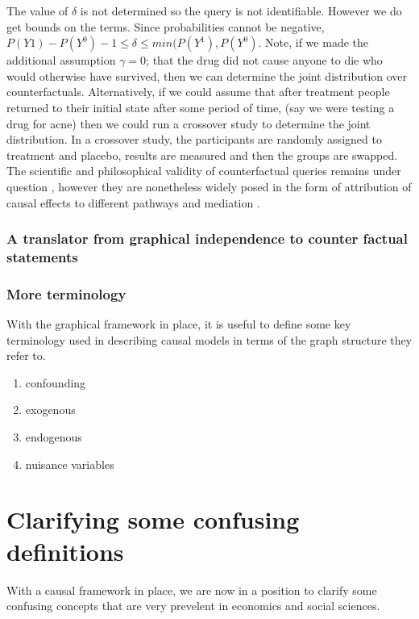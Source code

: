 The value of $\delta$ is not determined so the query is not identifiable. However we do get bounds on the terms. Since probabilities cannot be negative, $P(Y{1})-P(Y^{0})-1 \leq \delta \leq min(P(Y^{1}),P(Y^{0})$. Note, if we made the additional assumption $\gamma=0$; that the drug did not cause anyone to die who would otherwise have survived, then we can determine the joint distribution over counterfactuals. Alternatively, if we could assume that after treatment people returned to their initial state after some period of time, (say we were testing a drug for acne) then we could run a crossover study to determine the joint distribution. In a crossover study, the participants are randomly assigned to treatment and placebo, results are measured and then the groups are swapped. The scientific and philosophical validity of counterfactual queries remains under question \cite{Dawid2000,Dawid2014}, however they are nonetheless widely posed in the form of attribution of causal effects to different pathways and mediation \cite{Pearl2014,Imai2010a,VanderWeele2011}. 

\subsubsection{A translator from graphical independence to counter factual statements}

\subsubsection{More terminology}
With the graphical framework in place, it is useful to define some key terminology used in describing causal models in terms of the graph structure they refer to.

\begin{enumerate}
\item confounding
\item exogenous
\item endogenous
\item nuisance variables
\end{enumerate} 

\section{Clarifying some confusing definitions}

With a causal framework in place, we are now in a position to clarify some confusing concepts that are very prevelent in economics and social sciences.

